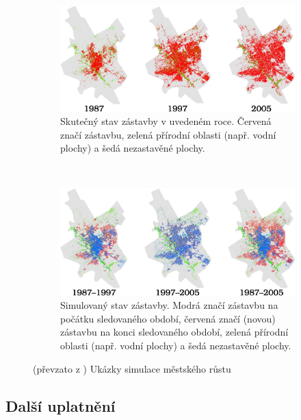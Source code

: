 \documentclass[a4paper,10pt]{article}
\begin{document}
\begin{figure}[]
    \begin{subfigure}[t]{\textwidth}
      \includegraphics[width=\textwidth]{genimg-urban-growt-city-1}
      \caption{Skutečný stav zástavby v uvedeném roce. Červená značí zástavbu, zelená přírodní oblasti (např. vodní plochy) a šedá nezastavěné plochy.} 
    \end{subfigure}
    \\
    \begin{subfigure}[t]{\textwidth} \centering
      \includegraphics[width=\textwidth]{genimg-urban-growt-city-2}
      \caption{Simulovaný stav zástavby. Modrá značí zástavbu na počátku sledovaného období, červená značí (novou) zástavbu na konci sledovaného období, zelená přírodní oblasti (např. vodní plochy) a šedá nezastavěné plochy.} 
    \end{subfigure}

    \caption[Ukázky simulace městského růstu]{(převzato z \cite{Ahm+-CalFuzCelAutModUrbDynSauAr}) Ukázky simulace městského růstu} \label{img:UrbGroProSample}
\end{figure}

\subsection{Další uplatnění}
\end{document}
